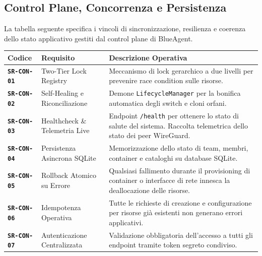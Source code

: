 \subsection{Control Plane, Concorrenza e
Persistenza}\label{control-plane-concorrenza-e-persistenza}

La tabella seguente specifica i vincoli di sincronizzazione, resilienza
e coerenza dello stato applicativo gestiti dal control plane di
BlueAgent.

\begin{longtable}[]{@{}
  >{\raggedright\arraybackslash}p{}
  >{\raggedright\arraybackslash}p{}
  >{\raggedright\arraybackslash}p{}@{}}
\toprule\noalign{}
\begin{minipage}[b]{\linewidth}\raggedright
Codice
\end{minipage} & \begin{minipage}[b]{\linewidth}\raggedright
Requisito
\end{minipage} & \begin{minipage}[b]{\linewidth}\raggedright
Descrizione Operativa
\end{minipage} \\
\midrule\noalign{}
\endhead
\bottomrule\noalign{}
\endlastfoot
\textbf{\passthrough{\lstinline!SR-CON-01!}} & Two-Tier Lock Registry &
Meccanismo di lock gerarchico a due livelli per prevenire race condition
sulle risorse. \\
\textbf{\passthrough{\lstinline!SR-CON-02!}} & Self-Healing e
Riconciliazione & Demone \passthrough{\lstinline!LifecycleManager!} per
la bonifica automatica degli switch e cloni orfani. \\
\textbf{\passthrough{\lstinline!SR-CON-03!}} & Healthcheck \& Telemetria
Live & Endpoint \passthrough{\lstinline!/health!} per ottenere lo stato
di salute del sistema. Raccolta telemetrica dello stato dei peer
WireGuard. \\
\textbf{\passthrough{\lstinline!SR-CON-04!}} & Persistenza Asincrona
SQLite & Memorizzazione dello stato di team, membri, container e
cataloghi su database SQLite. \\
\textbf{\passthrough{\lstinline!SR-CON-05!}} & Rollback Atomico su
Errore & Qualsiasi fallimento durante il provisioning di container o
interfacce di rete innesca la deallocazione delle risorse. \\
\textbf{\passthrough{\lstinline!SR-CON-06!}} & Idempotenza Operativa &
Tutte le richieste di creazione e configurazione per risorse già
esistenti non generano errori applicativi. \\
\textbf{\passthrough{\lstinline!SR-CON-07!}} & Autenticazione
Centralizzata & Validazione obbligatoria dell'accesso a tutti gli
endpoint tramite token segreto condiviso. \\
\end{longtable}

